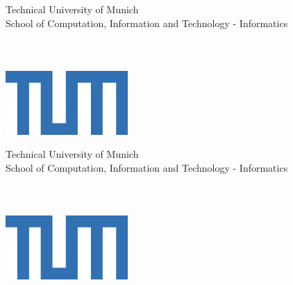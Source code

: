 \frontmatter
\begin{titlepage}
\begin{center}
{\huge Technical University of Munich\\}
{\Large School of Computation, Information and Technology - Informatics\\}
\vspace{3.5cm}
{\huge \getDoctype\\}
\vspace{4cm}
{\Huge \bfseries \getTitle\\}
\vspace{1.5cm}
{\huge \getAuthor\\}
\vfill
\includegraphics[width=0.35\textwidth]{layout/tum_logo}
\end{center}
\end{titlepage}
\begin{titlepage}
\begin{center}
{\huge Technical University of Munich\\}
{\Large School of Computation, Information and Technology - Informatics\\}
\vspace{2cm}
{\huge \getDoctype\\}
\vspace{1.5cm}
{\Huge \bfseries \getTitle\\}
\vspace{1cm}
{\Huge \bfseries \getTitleGer\\}
\vfill
\includegraphics[width=0.35\textwidth]{layout/tum_logo}
\end{center}
\end{titlepage}
\cleardoublepage{}

